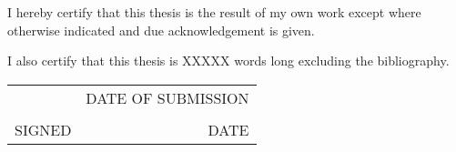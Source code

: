 
\begin{center}
\vspace{4cm}
I hereby certify that this thesis is the result of my own work except where otherwise indicated and due acknowledgement is given.
\vspace{1cm}

I also certify that this thesis is XXXXX words long excluding the bibliography.\\

\vspace{4cm}


\begin{tabular}{lr}
& DATE OF SUBMISSION \\
& \\
SIGNED & DATE \\
\end{tabular}


\end{center}




